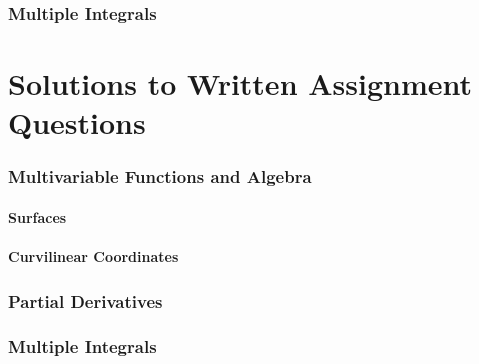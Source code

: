 \documentclass{article}
\begin{document}
\section{Multiple Integrals}


\newpage
\part{Solutions to Written Assignment Questions}
\setcounter{section}{1}

\section{Multivariable Functions and Algebra}

\newpage %

\newpage %
\subsection{Surfaces}
\newpage %
\subsection{Curvilinear Coordinates}
\newpage %

\newpage %

\newpage %

\section{Partial Derivatives}

\newpage

\section{Multiple Integrals}

\end{document}
